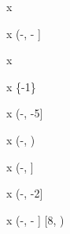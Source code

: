 \begin{exercicio}
\begin{answers}
\begin{mathlist}[2]
            \item x \in {}
            \item x \in \left(-\infty, - \right] \cup \left[\sqrt{5}, \infty\right)
            \item x \in \left[- \sfrac{3}{2}, 2\right]
            \item x \in \emptyset
            \item x \in \left\{-1\right\}
            \item x \in \left(-\infty, -5\right] \cup \left[2, \infty\right)
            \item x \in \left[-6, -3\right]
            \item x \in \left(-\infty, \infty\right)
            \item x \in \left(-\infty, \right] \cup \left[5, \infty\right)
            \item x \in \emptyset
            \item x \in \left(-\infty, \infty\right)
            \item x \in \left[-1, \sfrac{5}{3}\right]
            \item x \in \left(-\infty, -2\right] \cup \left[6, \infty\right)
            \item x \in \left[2, 18\right]
            \item x \in \left(-\infty, - \right] \cup {} \cup \left[8, \infty\right)
        \end{mathlist}
    \end{answers}
\end{exercicio}

